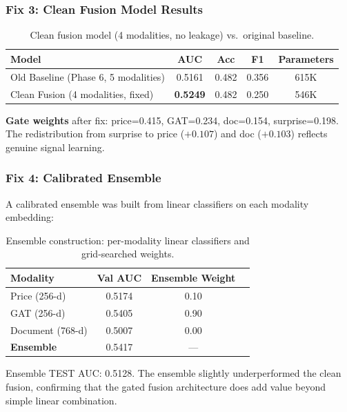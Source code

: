 \documentclass[12pt,a4paper]{article}
\begin{document}
\subsubsection{Fix 3: Clean Fusion Model Results}

\begin{table}[H]
\centering
\caption{Clean fusion model (4 modalities, no leakage) vs.\ original baseline.}
\begin{tabular}{lcccc}
\toprule
\textbf{Model} & \textbf{AUC} & \textbf{Acc} & \textbf{F1} & \textbf{Parameters} \\
\midrule
Old Baseline (Phase 6, 5 modalities) & 0.5161 & 0.482 & 0.356 & 615K \\
Clean Fusion (4 modalities, fixed)    & \textbf{0.5249} & 0.482 & 0.250 & 546K \\
\bottomrule
\end{tabular}
\end{table}

\textbf{Gate weights} after fix: price=0.415, GAT=0.234, doc=0.154, surprise=0.198. The redistribution from surprise to price ($+0.107$) and doc ($+0.103$) reflects genuine signal learning.

\subsubsection{Fix 4: Calibrated Ensemble}

A calibrated ensemble was built from linear classifiers on each modality embedding:

\begin{table}[H]
\centering
\caption{Ensemble construction: per-modality linear classifiers and grid-searched weights.}
\begin{tabular}{lccc}
\toprule
\textbf{Modality} & \textbf{Val AUC} & \textbf{Ensemble Weight} \\
\midrule
Price (256-d) & 0.5174 & 0.10 \\
GAT (256-d)   & 0.5405 & 0.90 \\
Document (768-d) & 0.5007 & 0.00 \\
\midrule
\textbf{Ensemble} & 0.5417 & --- \\
\bottomrule
\end{tabular}
\end{table}

\noindent Ensemble TEST AUC: 0.5128. The ensemble slightly underperformed the clean fusion, confirming that the gated fusion architecture does add value beyond simple linear combination.
\end{document}
